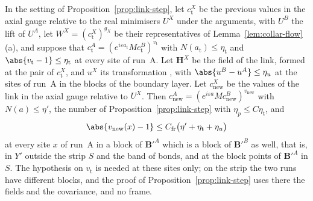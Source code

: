 

\begin{lemma}\label{lem:link-frames}
In the setting of Proposition~\ref{prop:link-step}, let $c^X_{\mathrm t}$ be the previous values in the axial gauge relative to the real minimisers $U^X$ under the arguments, with $U^B$ the lift of $U^A$, let $W^X = (c^X_{\mathrm t})^{g_X}$ be their representatives of Lemma~\ref{lem:collar-flow}(a), and suppose that $c^A_{\mathrm t} = (e^{i\varepsilon a_{\mathrm t}}Mc^B_{\mathrm t})^{v_{\mathrm t}}$ with $N(a_{\mathrm t}) \leq \eta_{\mathrm t}$ and $\abs{v_{\mathrm t} - 1} \leq \eta_{\mathrm t}$ at every site of run~A. Let $\mathbf H^X$ be the field of the link, formed at the pair of $c^X_{\mathrm t}$, and $u^X$ its transformation \cite[(106)]{BalabanAVG}, with $\abs{u^B - u^A} \leq \eta_u$ at the sites of run~A in the blocks of the boundary layer. Let $c^X_{\mathrm{new}}$ be the values of the link in the axial gauge relative to $U^X$. Then $c^A_{\mathrm{new}} = (e^{i\varepsilon a}Mc^B_{\mathrm{new}})^{v_{\mathrm{new}}}$ with $N(a) \leq \eta'$, the number of Proposition~\ref{prop:link-step} with $\eta_p \leq C\eta_{\mathrm t}$, and
\[
    \abs{v_{\mathrm{new}}(x) - 1} \leq C_{\mathrm{fr}}\bigl(\eta' + \eta_{\mathrm t} + \eta_u\bigr)
\]
at every site $x$ of run~A in a block of $\mathbf B'^A$ which is a block of $\mathbf B'^B$ as well, that is, in $Y'$ outside the strip $S$ and the band of bonds, and at the block points of $\mathbf B'^A$ in $S$. The hypothesis on $v_{\mathrm t}$ is needed at these sites only; on the strip the two runs have different blocks, and the proof of Proposition~\ref{prop:link-step} uses there the fields and the covariance, and no frame.
\end{lemma}

